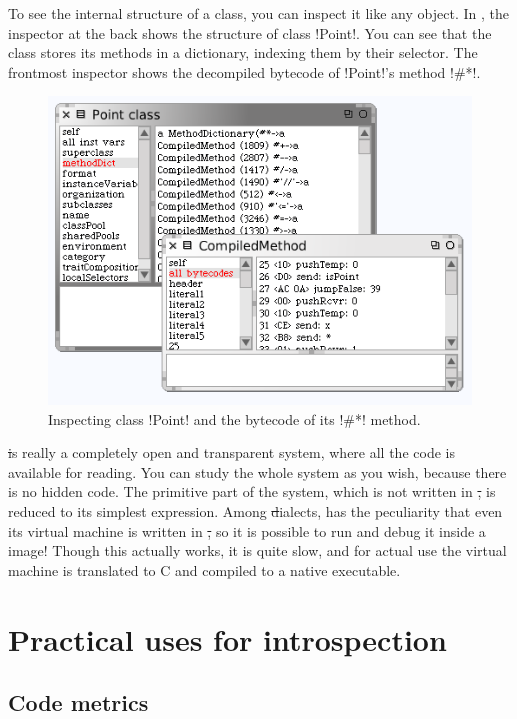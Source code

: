 \documentclass[a4paper,10pt,twoside]{book}
\begin{document}
To see the internal structure of a class, you can inspect it like any object.
In , the inspector at the back shows the structure of class \ct!Point!.
You can see that the class stores its methods in a dictionary, indexing them by their selector.
The frontmost inspector shows the decompiled bytecode of \ct!Point!'s method \ct!#*!.

\begin{figure}[ht]\centering
	\includegraphics[width=.75\linewidth]{CompiledMethod}
	\caption{Inspecting class \ct!Point! and the bytecode of its \ct!\#*! method.\label{fig:CompiledMethod}}
\end{figure}

\st is really a completely open and transparent system, where all the code is available for reading.
You can study the whole system as you wish, because there is no hidden code.
The primitive part of the system, \ie which is not written in \st, is reduced to its simplest expression.
Among \st dialects, \sq has the peculiarity that even its virtual machine is written in \st, so it is possible to run and debug it inside a \sq image!
Though this actually works, it is quite slow, and for actual use the virtual machine is translated to C and compiled to a native executable.



\section{Practical uses for introspection} %

\subsection{Code metrics}
\end{document}
